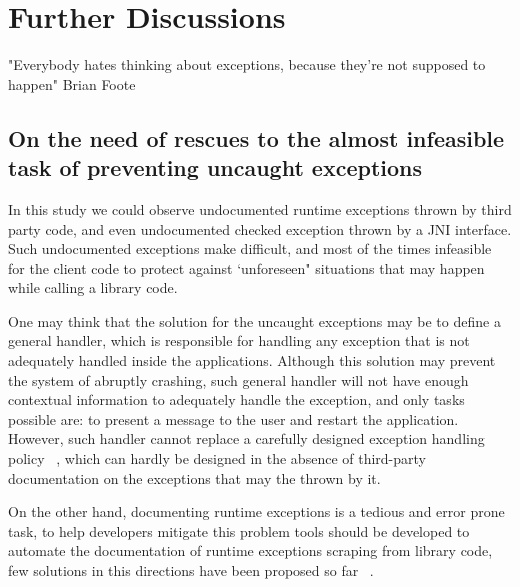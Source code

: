 \documentclass[conference]{IEEEtran}
\begin{document}
\noindent {}


\section{Further Discussions}
\label{sec:disc}


 "Everybody hates thinking about exceptions, because they’re not supposed to happen"
  Brian Foote


\subsection{On the need of rescues to the almost infeasible task of preventing uncaught exceptions}
In this study we could observe undocumented runtime exceptions thrown by third party code,
and even undocumented checked exception thrown by a JNI interface.
Such undocumented exceptions make difficult, and most of the times infeasible
for the client code to protect against `unforeseen" situations that may happen 
while calling a library code.

One may think that the solution for the uncaught exceptions may be to define a general handler, 
which is responsible for handling any exception that is not
adequately handled inside the applications. Although this 
solution may prevent  the system of abruptly crashing,
 such general handler will not have enough
contextual information to adequately handle the exception, 
and only tasks possible are: to present a message to the user
 and restart the application. However, such handler cannot replace a carefully designed exception 
handling policy ~\cite{Robil00}, which can hardly be designed in the absence of 
third-party documentation on the exceptions that
may the thrown by it.

On the other hand, documenting runtime exceptions is a tedious and error prone task, to help developers
mitigate this problem tools should be developed to automate the documentation of runtime exceptions
scraping from library code, few solutions in this directions have been proposed so far ~\cite{van2005combining}. 
\end{document}
